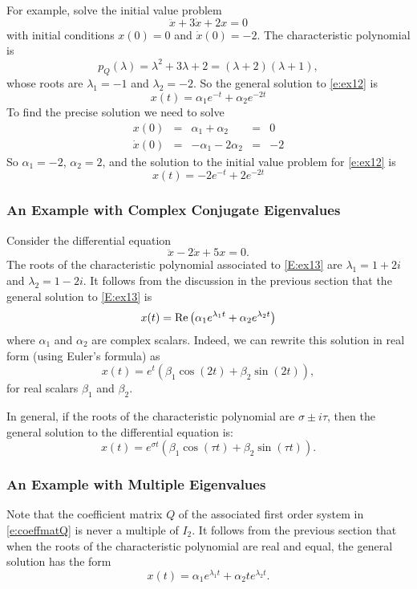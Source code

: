 \documentclass{ximera}
\begin{document}
For example, solve the initial value problem
\begin{equation} \label{e:ex12}
\ddot{x} + 3\dot{x} + 2x = 0
\end{equation}
with initial conditions $x(0)=0$ and $\dot{x}(0)=-2$.  The characteristic
polynomial is
\[
p_Q(\lambda) = \lambda^2 + 3\lambda + 2 = (\lambda+2)(\lambda+1),
\]
whose roots are $\lambda_1=-1$ and $\lambda_2=-2$.  So the general solution
to \eqref{e:ex12} is
\[
x(t) = \alpha_1e^{-t} + \alpha_2e^{-2t}
\]
To find the precise solution we need to solve
\[
\begin{array}{rclcl}
x(0) & = & \alpha_1 + \alpha_2 & = & 0 \\
\dot{x}(0) & = & -\alpha_1 - 2\alpha_2 & = & -2
\end{array}
\]
So $\alpha_1 = -2$, $\alpha_2=2$, and the solution to the initial value problem
for \eqref{e:ex12} is
\[
x(t) = -2e^{-t} + 2e^{-2t}
\]

\subsubsection*{An Example with Complex Conjugate Eigenvalues}

Consider the differential equation
\begin{equation} \label{E:ex13}
\ddot{x} -2\dot{x} + 5x = 0.
\end{equation}
The roots of the characteristic polynomial associated to \eqref{E:ex13} are
$\lambda_1=1+2i$ and $\lambda_2=1-2i$.  It follows from the discussion in
the previous section that the general solution to \eqref{E:ex13} is
\[
x(t) = {\rm Re}\left(\alpha_1 e^{\lambda_1 t} + \alpha_2 e^{\lambda_2t}\right)
\]
where $\alpha_1$ and $\alpha_2$ are complex scalars.  Indeed, we can rewrite
this solution in real form (using Euler's formula) as
\[
x(t) = e^t\left(\beta_1\cos(2t) + \beta_2\sin(2t)\right),
\]
for real scalars $\beta_1$ and $\beta_2$.

In general, if the roots of the characteristic polynomial are
$\sigma\pm i\tau$, then the general solution to the differential equation is:
\[
x(t) = e^{\sigma t}\left(\beta_1\cos(\tau t) + \beta_2\sin(\tau t)\right).
\]

\subsubsection*{An Example with Multiple Eigenvalues}

Note that the coefficient matrix $Q$ of the associated first order system
in \eqref{e:coeffmatQ} is never a multiple of $I_2$.  It follows from the
previous section
that when the roots of the characteristic polynomial are real and equal,
the general solution has the form
\[
x(t) = \alpha_1 e^{\lambda_1t} + \alpha_2te^{\lambda_2t}.
\]
\end{document}
